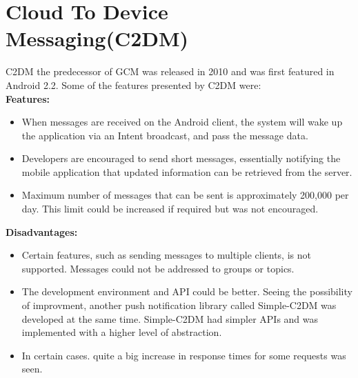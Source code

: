 \section{Cloud To Device Messaging(C2DM)}
C2DM the predecessor of GCM was released in 2010 and was first featured in Android 2.2. Some of the features presented by C2DM were:\\
\textbf{Features:}
      \begin{itemize}
      		\item When messages are received on the Android client, the
system will wake up the application via an Intent broadcast, and pass the message data.
		\item Developers are encouraged to
send short messages, essentially notifying the mobile
application that updated information can be retrieved
from the server.
		\item Maximum number of messages that can be sent is approximately 200,000 per day. This limit could be increased if required but was not encouraged.
	\end{itemize}
\textbf{Disadvantages:} 
      	\begin{itemize}
      		\item Certain features, such as sending messages to
multiple clients, is not supported. Messages could not be addressed to groups or topics.
		\item The development environment and API could be better. Seeing the possibility of improvment, another push notification library called Simple-C2DM was developed at the same time. Simple-C2DM had simpler APIs and was implemented with a higher level of abstraction.
		\item In certain cases.
quite a big increase in response times for some requests was seen.
	\end{itemize}
